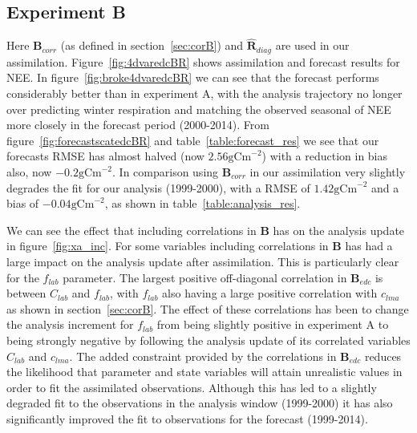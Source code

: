 \documentclass[11pt]{article}
\begin{document}

\subsection{Experiment B} \label{sec:expb}

Here $\textbf{B}_{corr}$ (as defined in section~\ref{sec:corB}) and $\hat{\textbf{R}}_{diag}$ are used in our assimilation. Figure~\ref{fig:4dvaredcBR} shows assimilation and forecast results for NEE. In figure~\ref{fig:broke4dvaredcBR} we can see that the forecast performs considerably better than in experiment A, with the analysis trajectory no longer over predicting winter respiration and matching the observed seasonal of NEE more closely in the forecast period (2000-2014). From figure~\ref{fig:forecastscatedcBR} and table~\ref{table:forecast_res} we see that our forecasts RMSE has almost halved (now $2.56 \text{gCm}^{-2}$) with a reduction in bias also, now $-0.2 \text{gCm}^{-2}$. In comparison using $\textbf{B}_{corr}$ in our assimilation very slightly degrades the fit for our analysis (1999-2000), with a RMSE of $1.42 \text{gCm}^{-2}$ and a bias of $-0.04 \text{gCm}^{-2}$, as shown in table~\ref{table:analysis_res}. 

We can see the effect that including correlations in $\textbf{B}$ has on the analysis update in figure~\ref{fig:xa_inc}. For some variables including correlations in $\textbf{B}$ has had a large impact on the analysis update after assimilation. This is particularly clear for the $f_{lab}$ parameter. The largest positive off-diagonal correlation in $\textbf{B}_{edc}$ is between $C_{lab}$ and $f_{lab}$, with $f_{lab}$ also having a large positive correlation with $c_{lma}$ as shown in section~\ref{sec:corB}. The effect of these correlations has been to change the analysis increment for $f_{lab}$ from being slightly positive in experiment A to being strongly negative by following the analysis update of its correlated variables $C_{lab}$ and $c_{lma}$. The added constraint provided by the correlations in $\textbf{B}_{edc}$ reduces the likelihood that parameter and state variables will attain unrealistic values in order to fit the assimilated observations. Although this has led to a slightly degraded fit to the observations in the analysis window (1999-2000) it has also significantly improved the fit to observations for the forecast (1999-2014).
\end{document}
